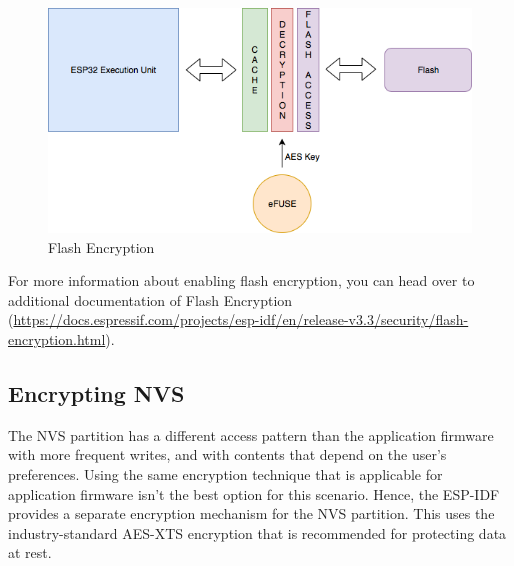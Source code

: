 \documentclass[main.tex]{subfiles}
\begin{document}
\begin{figure}[h!]
    \centering
    \includegraphics[scale=0.5]{../../_static/flash_encryption.png}
    \caption{Flash Encryption}
    \label{fig:flash_encrypt}
\end{figure}

For more information about enabling flash encryption, you can head over to additional documentation of Flash Encryption (\url{https://docs.espressif.com/projects/esp-idf/en/release-v3.3/security/flash-encryption.html}).

\subsection{Encrypting NVS}

The NVS partition has a different access pattern than the application firmware with more frequent writes, and with contents that depend on the user's preferences. Using the same encryption technique that is applicable for application firmware isn't the best option for this scenario. Hence, the ESP-IDF provides a separate encryption mechanism for the NVS partition. This uses the industry-standard AES-XTS encryption that is recommended for protecting data at rest.
\end{document}
